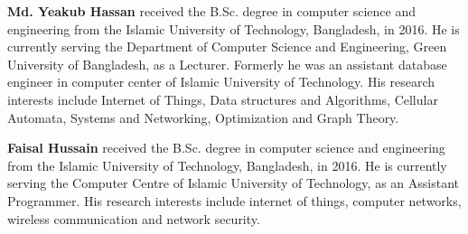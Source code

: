 \documentclass{ieeeaccess}
\begin{document}


\vspace{-50pt}
\begin{IEEEbiography}{\textbf{Md. Yeakub Hassan}} received the B.Sc. degree in computer science and engineering from the Islamic University of Technology, Bangladesh, in 2016. He is currently serving the Department of Computer Science and Engineering, Green University of Bangladesh, as a Lecturer. Formerly he was an assistant database engineer in computer center of Islamic University of Technology. His research interests include Internet of Things, Data structures and Algorithms, Cellular Automata, Systems and Networking, Optimization and Graph Theory.
\end{IEEEbiography}

\vspace{-45pt}
\begin{IEEEbiography}{\textbf{Faisal Hussain}}  received the B.Sc. degree in computer science and engineering from the Islamic University of Technology, Bangladesh, in 2016. He is currently serving the Computer Centre of Islamic University of Technology, as an Assistant Programmer. His research interests include internet of things, computer networks, wireless communication and network security.
\end{IEEEbiography}
\end{document}
